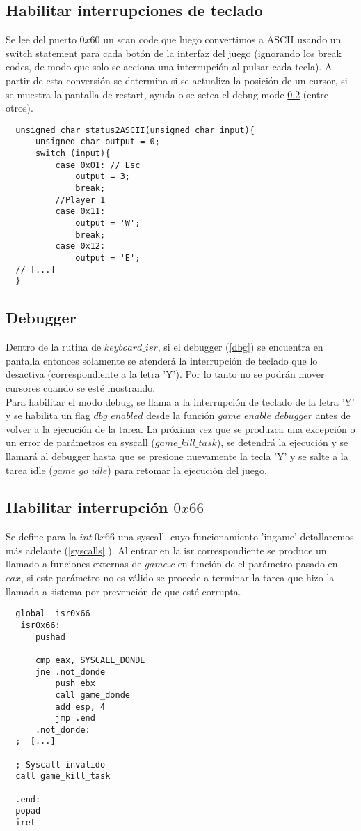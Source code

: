 \subsection{Habilitar interrupciones de teclado}
Se lee del puerto $0x60$ un scan code que luego convertimos a ASCII usando un switch statement para cada botón de la interfaz del juego (ignorando los break codes, de modo que solo se acciona una interrupción al pulsar cada tecla).
A partir de esta conversión se determina si se actualiza la posición de un cursor, si se muestra la pantalla de restart, ayuda o se setea el debug mode \ref{isr_dbg} (entre otros).

\begin{lstlisting}
  unsigned char status2ASCII(unsigned char input){
      unsigned char output = 0;
      switch (input){
          case 0x01: // Esc
              output = 3;
              break;
          //Player 1
          case 0x11:
              output = 'W';
              break;
          case 0x12:
              output = 'E';
  // [...]
  }
\end{lstlisting}


\subsection{Debugger}
\label{isr_dbg}
Dentro de la rutina de $keyboard\_isr$, si el debugger (\ref{dbg}) se encuentra en pantalla entonces solamente se atenderá la interrupción de teclado que lo desactiva (correspondiente a la letra 'Y').
Por lo tanto no se podrán mover cursores cuando se esté mostrando.\\
Para habilitar el modo debug, se llama a la interrupción de teclado de la letra 'Y' y se habilita un flag $dbg\_enabled$ desde la función $game\_enable\_debugger$ antes de volver a la ejecución de la tarea. La próxima vez que se produzca una excepción o un error de parámetros en syscall ($game\_kill\_task$), se detendrá la ejecución y se llamará al debugger hasta que se presione nuevamente la tecla 'Y' y se salte a la tarea idle ($game\_go\_idle$) para retomar la ejecución del juego.

\subsection{Habilitar interrupción $0x66$}
Se define para la $int\ 0x66$ una syscall, cuyo funcionamiento 'ingame' detallaremos más adelante (\ref{syscalls} ).
Al entrar en la isr correspondiente se produce un llamado a funciones externas de $game.c$ en función de el parámetro pasado en $eax$, si este parámetro no es válido se procede a terminar la tarea que hizo la llamada a sistema por prevención de que esté corrupta.
\begin{lstlisting}
  global _isr0x66
  _isr0x66:
      pushad

      cmp eax, SYSCALL_DONDE
      jne .not_donde
          push ebx
          call game_donde
          add esp, 4
          jmp .end
      .not_donde:
  ;  [...]

  ; Syscall invalido
  call game_kill_task

  .end:
  popad
  iret

\end{lstlisting}

